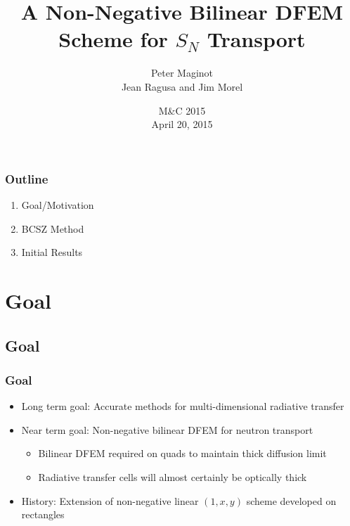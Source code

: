 \documentclass{beamer}
\title{A Non-Negative Bilinear DFEM Scheme for $S_N$ Transport}
\author{Peter Maginot \\ Jean Ragusa and Jim Morel}\institute{Texas A\&M University- Department of Nuclear Engineering}
\date{M\&C 2015 \\ April 20, 2015 }
\newif\ifplacelogo %
\begin{document}
\placelogotrue
\begin{frame}
\titlepage


\end{frame}


\placelogofalse

\begin{frame}
\frametitle{Outline}

\begin{enumerate}
\item Goal/Motivation
\item BCSZ Method
\item Initial Results
\end{enumerate}

\end{frame}


\section{Goal}

\subsection{Goal}
\begin{frame}
\frametitle{Goal}
\begin{itemize}
\item Long term goal: Accurate methods for multi-dimensional radiative transfer
\item Near term goal: Non-negative bilinear DFEM for neutron transport
\begin{itemize}
\item Bilinear DFEM required on quads to maintain thick diffusion limit
\item Radiative transfer cells will almost certainly be optically thick
\end{itemize}
\item History: Extension of non-negative linear $(1,x,y)$ scheme developed on rectangles
\end{itemize}
\end{frame}
\end{document}
